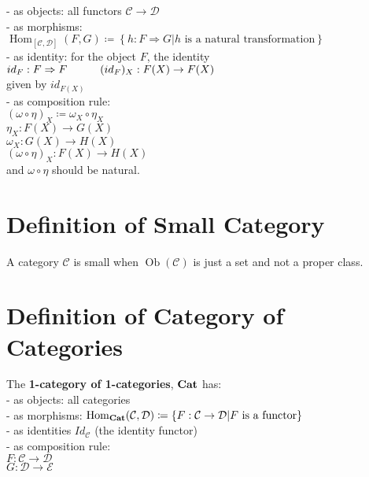 \documentclass[a4paper, twoside, english, 11pt]{book}
\newcommand{\braces}[1] {\left \{ #1 \right \}}
\DeclareMathOperator{\Hom}{Hom}
\DeclareMathOperator{\Ob}{Ob}
\newcommand{\C}{\mathcal C}
\newcommand{\D}{\mathcal D}
\newcommand{\E}{\mathcal E}
\newcommand{\catname}[1]{{\normalfont\textbf{#1}}}
\newcommand{\Cat}{\catname{Cat}}
\begin{document}
- as objects: all functors $\C \rightarrow \D$ \\

- as morphisms: $\Hom_{[\C, \D]}(F, G) \coloneqq \braces{h : F \Rightarrow G | h \text{ is a natural transformation}}$ \\

- as identity: for the object $F$, the identity $id_F : F \Rightarrow F \\
\indent\indent
(id_F)_X : F(X) \rightarrow F(X)$ \\
\indent\indent
given by $id_{F(X)}$ \\

- as composition rule: \\
\indent\indent
$(\omega \circ \eta)_X \coloneqq \omega_X \circ \eta_X$ \\

\indent\indent
$\eta_X : F(X) \rightarrow G(X)$ \\
\indent\indent
$\omega_X : G(X) \rightarrow H(X)$ \\
\indent\indent
$(\omega \circ \eta)_X : F(X) \rightarrow H(X)$ \\

and $\omega \circ \eta$ should be natural.



\section{Definition of Small Category}

A category $\C$ is small when $\Ob(\C)$ is just a set and not a proper class.



\section{Definition of Category of Categories}

The \textbf{1-category of 1-categories}, $\Cat$ has: \\

- as objects: all categories \\

- as morphisms: $\Hom_\Cat(\C, \D) \coloneqq \braces{F : \C \rightarrow \D | F \text{ is a functor}}$ \\

- as identities $Id_\C$ (the identity functor) \\

- as composition rule: \\
\indent\indent
$F : \C \rightarrow \D$ \\
\indent\indent
$G : \D \rightarrow \E$ \\
\end{document}
